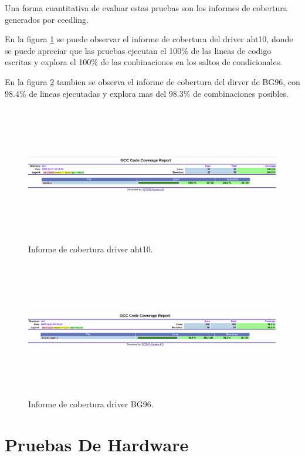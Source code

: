 Una forma cuantitativa de evaluar estas pruebas son los informes de cobertura generados por ceedling.

En la figura \ref{fig:Cobertura aht10} se puede observar el informe de cobertura del driver aht10, donde se puede apreciar que las pruebas ejecutan el 100\% de las lineas de codigo escritas y explora el 100\% de las conbinaciones en los saltos de condicionales.

En la figura \ref{fig:Cobertura BG96} tambien se observa el informe de cobertura del dirver de BG96, con 98.4\% de lineas ejecutadas y explora mas del 98.3\% de combinaciones posibles. 

\begin{figure}[h!]
    \centering
      \includegraphics[width=\linewidth, height=6cm]{./Figures/cobertura_aht10.png}
    \caption{Informe de cobertura driver aht10.}
      \label{fig:Cobertura aht10}
  \end{figure}

\begin{figure}[htbp!]
    \centering
      \includegraphics[width=\linewidth, height=6cm]{./Figures/cobertura_bg96.png}
    \caption{Informe de cobertura driver BG96.}
      \label{fig:Cobertura BG96}
\end{figure}
\section{Pruebas De Hardware}
